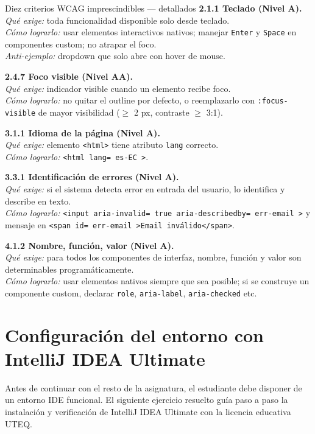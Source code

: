 \documentclass[11pt,a4paper,openany]{book}
\begin{document}
\begin{cajabuenas}{Diez criterios WCAG imprescindibles --- detallados}
\textbf{2.1.1 Teclado (Nivel A).}\\
\emph{Qué exige:} toda funcionalidad disponible solo desde teclado.\\
\emph{Cómo lograrlo:} usar elementos interactivos nativos; manejar
\texttt{Enter} y \texttt{Space} en componentes custom; no atrapar el
foco.\\
\emph{Anti-ejemplo:} dropdown que solo abre con hover de mouse.

\textbf{2.4.7 Foco visible (Nivel AA).}\\
\emph{Qué exige:} indicador visible cuando un elemento recibe foco.\\
\emph{Cómo lograrlo:} no quitar el outline por defecto, o
reemplazarlo con \texttt{:focus-visible} de mayor visibilidad
($\geq$ 2 px, contraste $\geq$ 3:1).

\textbf{3.1.1 Idioma de la página (Nivel A).}\\
\emph{Qué exige:} elemento \texttt{<html>} tiene atributo
\texttt{lang} correcto.\\
\emph{Cómo lograrlo:} \texttt{<html lang= es-EC >}.

\textbf{3.3.1 Identificación de errores (Nivel A).}\\
\emph{Qué exige:} si el sistema detecta error en entrada del usuario,
lo identifica y describe en texto.\\
\emph{Cómo lograrlo:} \texttt{<input aria-invalid= true 
aria-describedby= err-email >} y mensaje en
\texttt{<span id= err-email >Email inválido</span>}.

\textbf{4.1.2 Nombre, función, valor (Nivel A).}\\
\emph{Qué exige:} para todos los componentes de interfaz, nombre,
función y valor son determinables programáticamente.\\
\emph{Cómo lograrlo:} usar elementos nativos siempre que sea posible;
si se construye un componente custom, declarar
\texttt{role}, \texttt{aria-label}, \texttt{aria-checked} etc.
\end{cajabuenas}

\section{Configuración del entorno con IntelliJ IDEA Ultimate}

Antes de continuar con el resto de la asignatura, el estudiante
debe disponer de un entorno IDE funcional. El siguiente ejercicio
resuelto guía paso a paso la instalación y verificación de IntelliJ
IDEA Ultimate con la licencia educativa UTEQ.
\end{document}
